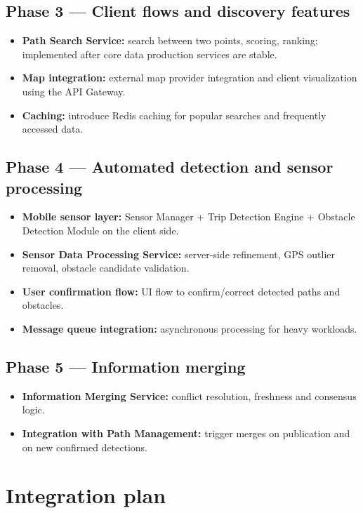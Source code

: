 \subsection{Phase 3 --- Client flows and discovery features}
\begin{itemize}
    \item \textbf{Path Search Service:} search between two points, scoring, ranking; implemented after core data production services are stable.
    \item \textbf{Map integration:} external map provider integration and client visualization using the API Gateway.
    \item \textbf{Caching:} introduce Redis caching for popular searches and frequently accessed data.
\end{itemize}

\subsection{Phase 4 --- Automated detection and sensor processing}
\begin{itemize}
    \item \textbf{Mobile sensor layer:} Sensor Manager + Trip Detection Engine + Obstacle Detection Module on the client side.
    \item \textbf{Sensor Data Processing Service:} server-side refinement, GPS outlier removal, obstacle candidate validation.
    \item \textbf{User confirmation flow:} UI flow to confirm/correct detected paths and obstacles.
    \item \textbf{Message queue integration:} asynchronous processing for heavy workloads.
\end{itemize}

\subsection{Phase 5 --- Information merging}
\begin{itemize}
    \item \textbf{Information Merging Service:} conflict resolution, freshness and consensus logic.
    \item \textbf{Integration with Path Management:} trigger merges on publication and on new confirmed detections.
\end{itemize}

\section{Integration plan}
\label{sec:integration_plan}%

